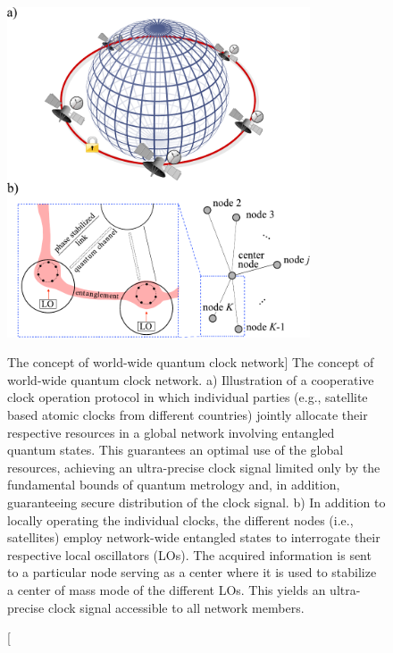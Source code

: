 \begin{figure}
\centering
\includegraphics[width=0.8\textwidth]{./figs_Komar2014/fig1.pdf}
\caption
[The concept of world-wide quantum clock network]
{
\label{fig:1} The concept of world-wide quantum clock network.
a) Illustration of a cooperative clock operation protocol in which individual parties (e.g., satellite based atomic clocks from different countries) jointly allocate
their respective resources in a global network involving entangled quantum states. This guarantees an
optimal use of the global resources, achieving an ultra-precise clock signal
limited only by the fundamental bounds of quantum metrology and,
in addition, guaranteeing secure distribution of the clock signal.
 b) In addition to locally operating the individual clocks, the different nodes
 (i.e., satellites) employ network-wide entangled states to interrogate their
 respective local oscillators (LOs). The acquired information is sent to a particular node serving as
 a center where it is used to stabilize a center of mass mode of the different
 LOs. This yields an ultra-precise clock signal accessible to all network
 members.}
\end{figure}







